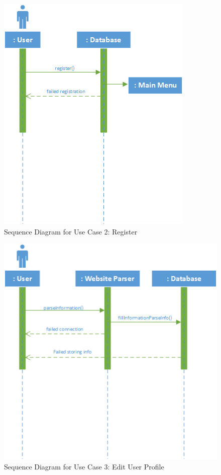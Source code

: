 \documentclass[11pt]{article}
\begin{document}
            \begin{figure}[H]
            \centering
            \includegraphics{SequenceUseCase2Register}
            \caption{Sequence Diagram for Use Case 2: Register}
            \label{SUC2}
            \end{figure}

            \begin{figure}[H]
            \centering
            \includegraphics{SequenceUseCase3EditUserProfile}
            \caption{Sequence Diagram for Use Case 3: Edit User Profile}
            \label{SUC3}
            \end{figure}
\end{document}
